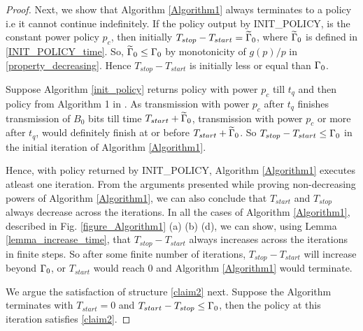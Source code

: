 \begin{proof}

Next, we show that Algorithm \ref{Algorithm1} always terminates to a policy i.e it cannot continue indefinitely. If the policy output by INIT\_POLICY, is the constant power policy $p_c$, then initially $T_{stop}-T_{start}=\widetilde{\Gamma}_0$, where $\widetilde{\Gamma}_0$ is defined in \eqref{INIT_POLICY_time}. So, $\widetilde{\Gamma}_0\le \Gamma_0$ by monotonicity of $g(p)/p$ in \eqref{property_decreasing}. Hence $T_{stop}-T_{start}$ is initially less or equal than $\Gamma_0$.

Suppose Algorithm \ref{init_policy} returns policy with power $p_c$ till $t_q$ and then policy from Algorithm 1 in  \cite{Yang}. As transmission with power $p_c$ after $t_q$ finishes transmission of $B_0$ bits till time $T_{start}+\widetilde{\Gamma}_0$, transmission with power $p_c$ or more after $t_q$, would definitely finish at or before $T_{start}+\widetilde{\Gamma}_0$. So $T_{stop}-T_{start}\le \Gamma_0$ in the initial iteration of Algorithm \ref{Algorithm1}. 

Hence, with policy returned by INIT\_POLICY, Algorithm \ref{Algorithm1} executes atleast one iteration. From the arguments presented while proving non-decreasing powers of Algorithm \ref{Algorithm1}, we can also conclude that $T_{start}$ and $T_{stop}$ always decrease across the iterations. In all the cases of Algorithm \ref{Algorithm1}, described in Fig. \ref{figure_Algorithm1} (a) (b) (d), we can show, using Lemma \ref{lemma_increase_time}, that $T_{stop}-T_{start}$ always increases across the iterations in finite steps. So after some finite number of iterations, $T_{stop}-T_{start}$ will increase beyond $\Gamma_0$, or $T_{start}$ would reach 0 and Algorithm \ref{Algorithm1} would terminate.

We argue the satisfaction of structure \eqref{claim2} next. Suppose the Algorithm terminates with $T_{start}=0$ and $T_{start}-T_{stop}\le\Gamma_0$, then the policy at this iteration satisfies \eqref{claim2}. 


\end{proof}
